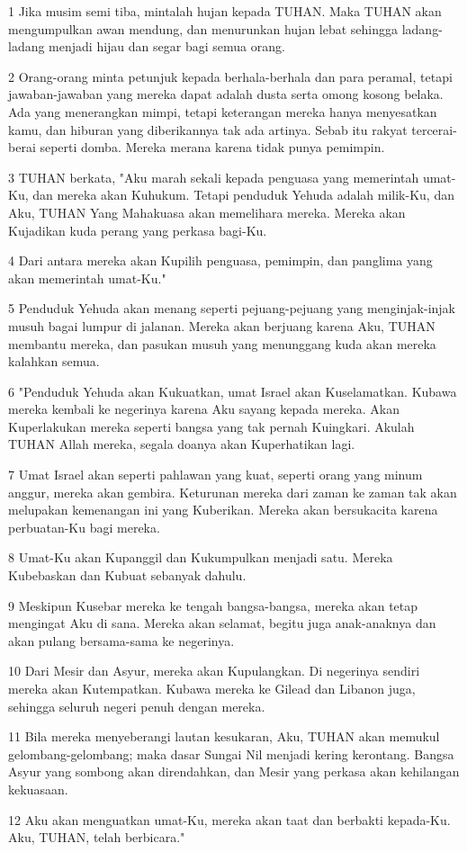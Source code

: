 \par 1 Jika musim semi tiba, mintalah hujan kepada TUHAN. Maka TUHAN akan mengumpulkan awan mendung, dan menurunkan hujan lebat sehingga ladang-ladang menjadi hijau dan segar bagi semua orang.
\par 2 Orang-orang minta petunjuk kepada berhala-berhala dan para peramal, tetapi jawaban-jawaban yang mereka dapat adalah dusta serta omong kosong belaka. Ada yang menerangkan mimpi, tetapi keterangan mereka hanya menyesatkan kamu, dan hiburan yang diberikannya tak ada artinya. Sebab itu rakyat tercerai-berai seperti domba. Mereka merana karena tidak punya pemimpin.
\par 3 TUHAN berkata, "Aku marah sekali kepada penguasa yang memerintah umat-Ku, dan mereka akan Kuhukum. Tetapi penduduk Yehuda adalah milik-Ku, dan Aku, TUHAN Yang Mahakuasa akan memelihara mereka. Mereka akan Kujadikan kuda perang yang perkasa bagi-Ku.
\par 4 Dari antara mereka akan Kupilih penguasa, pemimpin, dan panglima yang akan memerintah umat-Ku."
\par 5 Penduduk Yehuda akan menang seperti pejuang-pejuang yang menginjak-injak musuh bagai lumpur di jalanan. Mereka akan berjuang karena Aku, TUHAN membantu mereka, dan pasukan musuh yang menunggang kuda akan mereka kalahkan semua.
\par 6 "Penduduk Yehuda akan Kukuatkan, umat Israel akan Kuselamatkan. Kubawa mereka kembali ke negerinya karena Aku sayang kepada mereka. Akan Kuperlakukan mereka seperti bangsa yang tak pernah Kuingkari. Akulah TUHAN Allah mereka, segala doanya akan Kuperhatikan lagi.
\par 7 Umat Israel akan seperti pahlawan yang kuat, seperti orang yang minum anggur, mereka akan gembira. Keturunan mereka dari zaman ke zaman tak akan melupakan kemenangan ini yang Kuberikan. Mereka akan bersukacita karena perbuatan-Ku bagi mereka.
\par 8 Umat-Ku akan Kupanggil dan Kukumpulkan menjadi satu. Mereka Kubebaskan dan Kubuat sebanyak dahulu.
\par 9 Meskipun Kusebar mereka ke tengah bangsa-bangsa, mereka akan tetap mengingat Aku di sana. Mereka akan selamat, begitu juga anak-anaknya dan akan pulang bersama-sama ke negerinya.
\par 10 Dari Mesir dan Asyur, mereka akan Kupulangkan. Di negerinya sendiri mereka akan Kutempatkan. Kubawa mereka ke Gilead dan Libanon juga, sehingga seluruh negeri penuh dengan mereka.
\par 11 Bila mereka menyeberangi lautan kesukaran, Aku, TUHAN akan memukul gelombang-gelombang; maka dasar Sungai Nil menjadi kering kerontang. Bangsa Asyur yang sombong akan direndahkan, dan Mesir yang perkasa akan kehilangan kekuasaan.
\par 12 Aku akan menguatkan umat-Ku, mereka akan taat dan berbakti kepada-Ku. Aku, TUHAN, telah berbicara."

